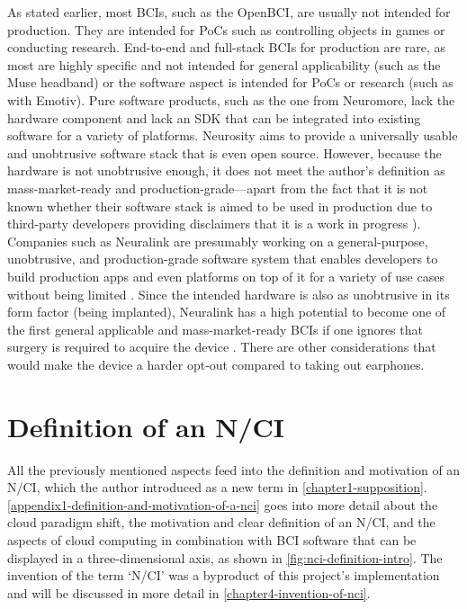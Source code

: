 As stated earlier, most BCIs, such as the OpenBCI, are usually not intended for production. They are intended for PoCs such as controlling objects in games or conducting research. End-to-end and full-stack BCIs for production are rare, as most are highly specific and not intended for general applicability (such as the Muse headband) or the software aspect is intended for PoCs or research (such as with Emotiv). Pure software products, such as the one from Neuromore, lack the hardware component and lack an SDK that can be integrated into existing software for a variety of platforms. Neurosity aims to provide a universally usable and unobtrusive software stack that is even open source. However, because the hardware is not unobtrusive enough, it does not meet the author’s definition as mass-market-ready and production-grade—apart from the fact that it is not known whether their software stack is aimed to be used in production \citep{neurosity_neurosity_2022} due to third-party developers providing disclaimers that it is a work in progress \citep{turney_notion_2022}). Companies such as Neuralink are presumably working on a general-purpose, unobtrusive, and production-grade software system that enables developers to build production apps and even platforms on top of it for a variety of use cases without being limited \citep{musk_integrated_2019}. Since the intended hardware is also as unobtrusive in its form factor (being implanted), Neuralink has a high potential to become one of the first general applicable and mass-market-ready BCIs if one ignores that surgery is required to acquire the device \citep{neuralink_approach_nodate}. There are other considerations that would make the device a harder opt-out compared to taking out earphones.

\section{Definition of an N/CI}
\label{chapter2-definition-of-an-nci}

All the previously mentioned aspects feed into the definition and motivation of an N/CI, which the author introduced as a new term in \autoref{chapter1-supposition}. \autoref{appendix1-definition-and-motivation-of-a-nci} goes into more detail about the cloud paradigm shift, the motivation and clear definition of an N/CI, and the aspects of cloud computing in combination with BCI software that can be displayed in a three-dimensional axis, as shown in \autoref{fig:nci-definition-intro}. The invention of the term ‘N/CI’ was a byproduct of this project’s implementation and will be discussed in more detail in \autoref{chapter4-invention-of-nci}.

